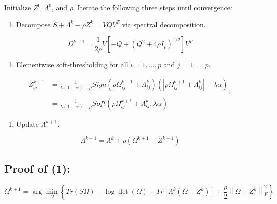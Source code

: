 \documentclass[12pt,]{book}
\providecommand{\tightlist}{%
  \setlength{\itemsep}{0pt}\setlength{\parskip}{0pt}}
\theoremstyle{definition}
\theoremstyle{definition}
\theoremstyle{definition}
\theoremstyle{remark}
\begin{document}
\vspace{1cm}

Initialize \(Z^{0}, \Lambda^{0}\), and \(\rho\). Iterate the following
three steps until convergence:

\begin{enumerate}
\def\labelenumi{\arabic{enumi}.}
\tightlist
\item
  Decompose \(S + \Lambda^{k} - \rho Z^{k} = VQV^{T}\) via spectral
  decomposition.
\end{enumerate}

\[ \Omega^{k + 1} = \frac{1}{2\rho}V\left[ -Q + \left( Q^{2} + 4\rho I_{p} \right)^{1/2} \right]V^{T} \]

\begin{enumerate}
\def\labelenumi{\arabic{enumi}.}
\setcounter{enumi}{1}
\tightlist
\item
  Elementwise soft-thresholding for all \(i = 1,..., p\) and
  \(j = 1,..., p\).
\end{enumerate}

\begin{align*}
Z_{ij}^{k + 1} &= \frac{1}{\lambda(1 - \alpha) + \rho}Sign\left(\rho\Omega_{ij}^{k + 1} + \Lambda_{ij}^{k}\right)\left( \left| \rho\Omega_{ij}^{k + 1} + \Lambda_{ij}^{k} \right| - \lambda\alpha \right)_{+} \\
&= \frac{1}{\lambda(1 - \alpha) + \rho}Soft\left(\rho\Omega_{ij}^{k + 1} + \Lambda_{ij}^{k}, \lambda\alpha\right)
\end{align*}

\begin{enumerate}
\def\labelenumi{\arabic{enumi}.}
\setcounter{enumi}{2}
\tightlist
\item
  Update \(\Lambda^{k + 1}\).
\end{enumerate}

\[ \Lambda^{k + 1} = \Lambda^{k} + \rho\left( \Omega^{k + 1} - Z^{k + 1} \right) \]

\vspace{1cm}

\hypertarget{proof-of-1}{%
\subsection{Proof of (1):}\label{proof-of-1}}

\[ \Omega^{k + 1} = \arg\min_{\Omega}\left\{ Tr\left(S\Omega\right) - \log\det\left(\Omega\right) + Tr\left[\Lambda^{k}\left(\Omega - Z^{k}\right)\right] + \frac{\rho}{2}\left\| \Omega - Z^{k} \right\|_{F}^{2} \right\} \]
\end{document}
